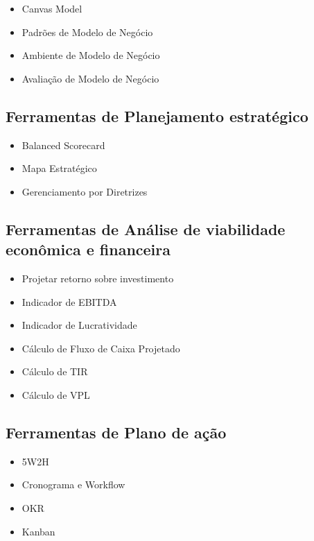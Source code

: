 \documentclass{abnt}
\begin{document}
\begin{itemize}
	\item Canvas Model
	\item Padrões de Modelo de Negócio
	\item Ambiente de Modelo de Negócio
	\item Avaliação de Modelo de Negócio
\end{itemize}


\subsection{Ferramentas de Planejamento estratégico}

\begin{itemize}
	\item Balanced Scorecard
	\item Mapa Estratégico
	\item Gerenciamento por Diretrizes
\end{itemize}

\subsection{Ferramentas de Análise de viabilidade econômica e financeira}

\begin{itemize}
	\item Projetar retorno sobre investimento
	\item Indicador de EBITDA
	\item Indicador de Lucratividade
	\item Cálculo de Fluxo de Caixa Projetado
	\item Cálculo de TIR
	\item Cálculo de VPL
\end{itemize}

\subsection{Ferramentas de Plano de ação}

\begin{itemize}
	\item 5W2H
	\item Cronograma e Workflow
	\item OKR
	\item Kanban
\end{itemize}

\end{document}
